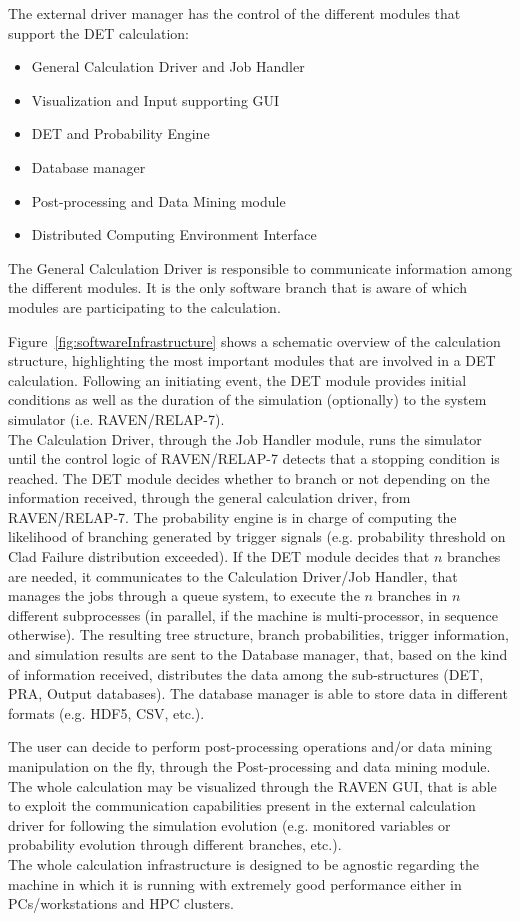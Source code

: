 The external driver manager has the control of the different modules that support the DET calculation:
\vspace{-5mm}
\begin{itemize}
\itemsep0em
\item General Calculation Driver and Job Handler
\item Visualization and Input supporting GUI
\item DET and Probability Engine
\item Database manager
\item Post-processing and Data Mining module
\item Distributed Computing Environment Interface
\end{itemize}
\vspace{-5mm}
The General Calculation Driver is responsible to communicate information among the different modules. It is the only software branch that is aware of which modules are participating to the calculation.   

Figure~\ref{fig:softwareInfrastructure} shows a schematic overview of the calculation structure, highlighting the most important modules that are involved in a DET calculation. Following an initiating event, the DET module provides initial conditions as well as the duration of the simulation (optionally) to the system simulator (i.e. RAVEN/RELAP-7). 
\\The Calculation Driver, through the Job Handler module, runs the simulator until the control logic of RAVEN/RELAP-7 detects that a stopping condition is reached. The DET module decides whether to branch or not depending on the information received, through the general calculation driver, from RAVEN/RELAP-7. 
The probability engine is in charge of computing the likelihood of branching generated by trigger signals (e.g. probability threshold on Clad Failure distribution exceeded).  If the DET module decides that $n$ branches are needed, it communicates to the Calculation Driver/Job Handler, that manages the jobs through a queue system, to execute the $n$ branches in $n$ different subprocesses (in parallel, if the machine is multi-processor, in sequence otherwise). The resulting tree structure, branch probabilities, trigger information, and simulation results are sent to the Database manager, that, based on the kind of information received, distributes the data among the sub-structures (DET, PRA, Output databases). The database manager is able to store data in different formats (e.g. HDF5, CSV, etc.). 

The user can decide to perform post-processing operations and/or data mining manipulation on the fly, through the Post-processing and data mining module. The whole calculation may be visualized through the RAVEN GUI, that is able to exploit the communication capabilities present in the external calculation driver for following the simulation evolution (e.g. monitored variables or probability evolution through different branches, etc.). \\ The whole calculation infrastructure is designed to be agnostic regarding the machine in which it is running with extremely good performance either in PCs/workstations and HPC clusters. 
